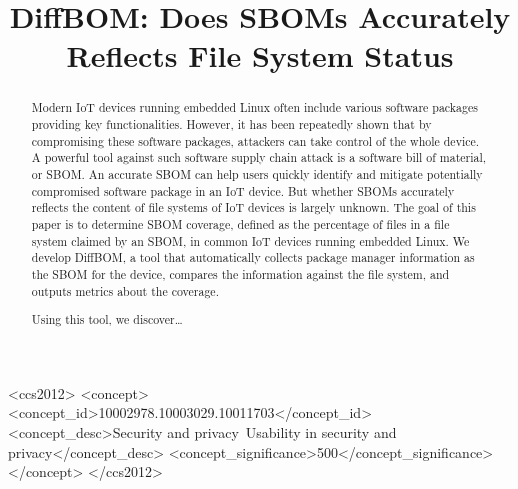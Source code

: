 \documentclass[sigconf, anonymous]{acmart}
\begin{document}
\title{DiffBOM: Does SBOMs Accurately Reflects File System Status} %

\begin{abstract}
Modern IoT devices running embedded Linux often include various software packages providing key functionalities. However, it has been repeatedly shown that by compromising these software packages, attackers can take control of the whole device. A powerful tool against such software supply chain attack is a software bill of material, or SBOM. An accurate SBOM can help users quickly identify and mitigate potentially compromised software package in an IoT device. But whether SBOMs accurately reflects the content of file systems of IoT devices is largely unknown. The goal of this paper is to determine SBOM coverage, defined as the percentage of files in a file system claimed by an SBOM, in common IoT devices running embedded Linux. We develop DiffBOM, a tool that automatically collects package manager information as the SBOM for the device, compares the information against the file system, and outputs metrics about the coverage.\par
Using this tool, we discover…
\end{abstract}

\begin{CCSXML}
<ccs2012>
<concept>
<concept_id>10002978.10003029.10011703</concept_id>
<concept_desc>Security and privacy~Usability in security and privacy</concept_desc>
<concept_significance>500</concept_significance>
</concept>
</ccs2012>
\end{CCSXML}



\maketitle




\end{document}
